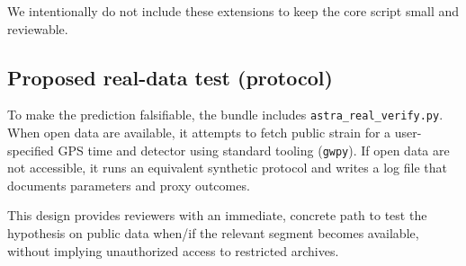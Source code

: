 We intentionally do not include these extensions to keep the core script small and reviewable.

\subsection{Proposed real-data test (protocol)}
To make the prediction falsifiable, the bundle includes \texttt{astra\_real\_verify.py}. When open data are available, it attempts to fetch public strain for a user-specified GPS time and detector using standard tooling (\texttt{gwpy}). If open data are not accessible, it runs an equivalent synthetic protocol and writes a log file that documents parameters and proxy outcomes.

This design provides reviewers with an immediate, concrete path to test the hypothesis on public data when/if the relevant segment becomes available, without implying unauthorized access to restricted archives.
